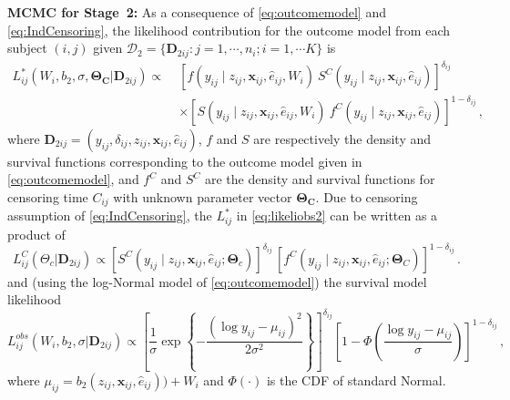 \documentclass[aoas]{imsart}
\theoremstyle{plain}
\theoremstyle{definition}
\begin{document}
\textbf{MCMC for Stage~2:}
As a consequence of \eqref{eq:outcomemodel} and \eqref{eq:IndCensoring}, the likelihood contribution for the outcome model from each subject $(i,j)$ given $\mathcal{D}_2=\{\mathbf{D}_{2ij}: j=1,\cdots, n_i; i=1,\cdots K\}$ is 
\begin{equation}
\begin{split}
L_{ij}^{\text{*}}(W_i, b_2, \sigma,\mathbf{\Theta}_{\mathbf{C}}\vert \mathbf{D}_{2ij}) \propto\;&
\left[
f(y_{ij}\mid z_{ij}, \mathbf{x}_{ij} , \hat{e}_{ij},W_i) 
\ S^C(y_{ij}\mid z_{ij}, \mathbf{x}_{ij}, \hat{e}_{ij})
\right]^{\delta_{ij}} \\
&\times
\left[
S(y_{ij}\mid z_{ij}, \mathbf{x}_{ij}, \hat{e}_{ij},W_i) 
\ f^C(y_{ij}\mid z_{ij}, \mathbf{x}_{ij},\hat{e}_{ij})
\right]^{1 - \delta_{ij}}
\hspace{2pt},
\end{split}
\label{eq:likeliobs2}
\end{equation}
\noindent where $\mathbf{D}_{2ij}=(y_{ij},\delta_{ij},z_{ij},\mathbf{x}_{ij},\hat{e}_{ij})$,  $f$ and $S$ are respectively the density and survival functions corresponding to the  outcome model given in \eqref{eq:outcomemodel},  and $f^C$ and $S^C$ are the density and survival functions for censoring time $C_{ij}$ with unknown parameter vector  $\mathbf{\Theta}_{\mathbf{C}}$. 
Due to censoring assumption of \eqref{eq:IndCensoring}, the $L_{ij}^*$ in \eqref{eq:likeliobs2} can be written 
as a product of 
\begin{equation}
L_{ij}^{C}(\Theta_c \vert \mathbf{D}_{2ij}) \propto 
[S^C(y_{ij} \mid z_{ij}, \mathbf{x}_{ij},\hat{e}_{ij}; \mathbf{\Theta}_c)]^{\delta_{ij}} \,
[f^C(y_{ij} \mid z_{ij},\mathbf{x}_{ij}, \hat{e}_{ij};\mathbf{\Theta}_C)]^{1 - \delta_{ij}}
\hspace{2pt}.
\label{eq:likeliobs}
\end{equation}
and (using the log-Normal model of \eqref{eq:outcomemodel}) the survival model likelihood 
\begin{equation}
L^{obs}_{ij}(W_i, b_2,\sigma\vert \mathbf{D}_{2ij}) \propto \left[\frac{1}{\sigma} \exp\left\{-\frac{(\log y_{ij} - \mu_{ij})^2}{2\sigma^2}\right\}\right]^{\delta_{ij}} \left[1 - \Phi\left(\frac{\log y_{ij} - \mu_{ij}}{\sigma}\right)\right]^{1-\delta_{ij}}
\hspace{2pt}, 
\label{eq:densityobs}
\end{equation}
where $\mu_{ij} = b_2(z_{ij}, \mathbf{x}_{ij}, \hat{e}_{ij})) + W_i$ and $\Phi(\cdot)$ is the CDF of standard Normal. 
\end{document}
